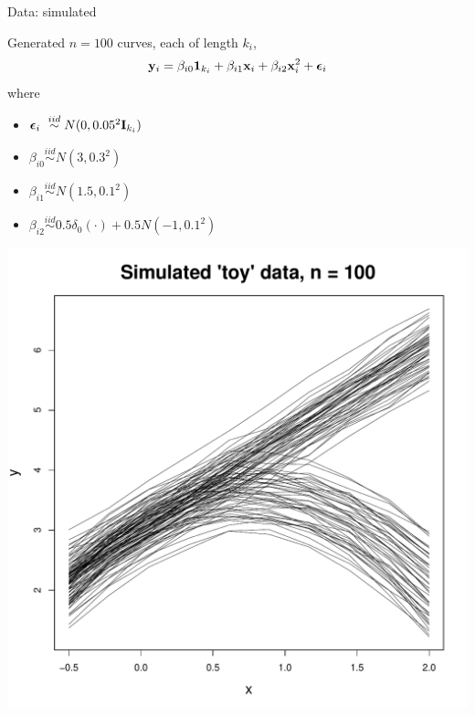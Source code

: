 \documentclass[mathserif, 12pt, t]{beamer}
\begin{document}

%
%


\begin{frame}{Data: simulated}

\begin{minipage}{0.60\textwidth}
Generated $n=100$ curves, each of length $k_i$,
\[ \mathbf{\bm{y}}_i = \beta_{i0}\mathbf{\bm{1}}_{k_i} + \beta_{i1}\mathbf{\bm{x}}_i + \beta_{i2}\mathbf{\bm{x}}_i^2 + \mathbf{\bm{\epsilon}}_i \]
where

\begin{itemize}[label=$\cdot$]
\item $\mathbf{\bm{\epsilon}}_i~ \overset{iid}\sim N(0, 0.05^2\mathbf{\bm{I}}_{k_i})$
\item $\beta_{i0} \overset{iid}\sim N(3, 0.3^2)$
\item $\beta_{i1} \overset{iid}\sim N(1.5, 0.1^2)$
\item $\beta_{i2} \overset{iid}\sim 0.5\delta_0(\cdot) + 0.5N(-1, 0.1^2)$
\end{itemize}

\end{minipage}
\begin{minipage}{0.35\textwidth}
\includegraphics[scale=0.25]{../figs/toy_data.pdf}
\end{minipage}

\end{frame}
\end{document}
